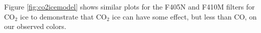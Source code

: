 \documentclass[times,astrosymb,twocolumn]{aastex631}
\def\rr#1{#1}
\begin{document}
Figure \ref{fig:co2icemodel} shows similar plots for the F405N and F410M filters \rr{for} CO$_2$ ice to demonstrate that CO$_2$ ice can have some effect, but \rr{less than CO}, on our observed colors.

% 




\end{document}
